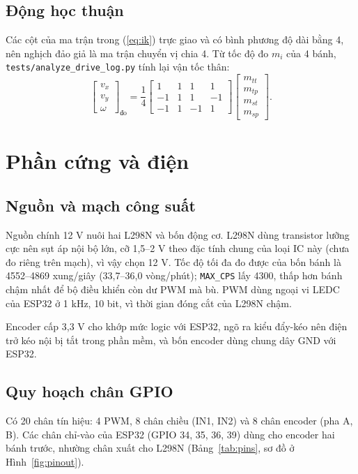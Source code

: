 \documentclass[11pt,a4paper]{article}
\newcommand{\code}[1]{\texttt{\small #1}}
\begin{document}
\subsection{Động học thuận}
Các cột của ma trận trong (\ref{eq:ik}) trực giao và có bình phương độ dài bằng 4, nên nghịch đảo giả là ma trận chuyển vị chia 4. Từ tốc độ đo $m_i$ của 4 bánh, \code{tests/analyze\_drive\_log.py} tính lại vận tốc thân:
\begin{equation}
\begin{bmatrix}v_x\\v_y\\\omega\end{bmatrix}_{\text{đo}}=\frac14
\begin{bmatrix}1&1&1&1\\-1&1&1&-1\\-1&1&-1&1\end{bmatrix}
\begin{bmatrix}m_{tt}\\m_{tp}\\m_{st}\\m_{sp}\end{bmatrix}.
\label{eq:fk}
\end{equation}

\section{Phần cứng và điện}
\subsection{Nguồn và mạch công suất}
Nguồn chính 12 V nuôi hai L298N và bốn động cơ. L298N dùng transistor lưỡng cực nên sụt áp nội bộ lớn, cỡ 1,5--2 V theo đặc tính chung của loại IC này (chưa đo riêng trên mạch), vì vậy chọn 12 V. Tốc độ tối đa đo được của bốn bánh là 4552--4869 xung/giây (33,7--36,0 vòng/phút); \code{MAX\_CPS} lấy 4300, thấp hơn bánh chậm nhất để bộ điều khiển còn dư PWM mà bù. PWM dùng ngoại vi LEDC của ESP32 ở 1 kHz, 10 bit, vì thời gian đóng cắt của L298N chậm.

Encoder cấp 3,3 V cho khớp mức logic với ESP32, ngõ ra kiểu đẩy-kéo nên điện trở kéo nội bị tắt trong phần mềm, và bốn encoder dùng chung dây GND với ESP32.

\subsection{Quy hoạch chân GPIO}
Có 20 chân tín hiệu: 4 PWM, 8 chân chiều (IN1, IN2) và 8 chân encoder (pha A, B). Các chân chỉ-vào của ESP32 (GPIO 34, 35, 36, 39) dùng cho encoder hai bánh trước, nhường chân xuất cho L298N (Bảng~\ref{tab:pins}, sơ đồ ở Hình~\ref{fig:pinout}).
\end{document}
